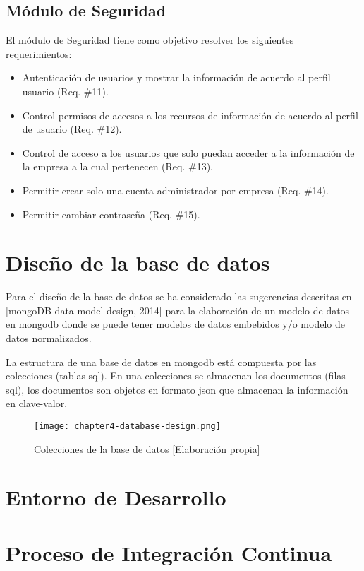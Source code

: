 \subsection{Módulo de Seguridad}
\noindent El módulo de Seguridad tiene como objetivo resolver los siguientes requerimientos:
\begin{itemize}
\item Autenticación de usuarios y mostrar la información de acuerdo al perfil usuario (Req. \#11).
\item Control permisos de accesos a los recursos de información de acuerdo al perfil de usuario (Req. \#12).
\item Control de acceso a los usuarios que solo puedan acceder a la información de la empresa a la cual pertenecen (Req. \#13).
\item Permitir crear solo una cuenta administrador por empresa (Req. \#14).
\item Permitir cambiar contraseña (Req. \#15).
\end{itemize}

\section{Diseño de la base de datos}
\noindent Para el diseño de la base de datos se ha considerado las sugerencias descritas en [mongoDB data model design, 2014] para la elaboración de un modelo de datos en mongodb donde se puede tener modelos de datos embebidos y/o modelo de datos normalizados.

\noindent La estructura de una base de datos en mongodb está compuesta por las colecciones (tablas sql). En una colecciones se almacenan los documentos (filas sql), los documentos son objetos en formato json que almacenan la información en clave-valor.

\begin{figure}[H]
  \centering
  \texttt{[image: chapter4-database-design.png]}
  \caption{Colecciones de la base de datos [Elaboración propia]}  
\end{figure}

\section{Entorno de Desarrollo}

\section{Proceso de Integración Continua}



 
